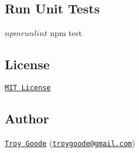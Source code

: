 \subsection*{Run Unit Tests}


\begin{DoxyCode}
$ npm run lint
$ npm test
\end{DoxyCode}


\subsection*{License}

\href{http://www.opensource.org/licenses/mit-license.php}{\tt M\+IT License}

\subsection*{Author}

\href{https://github.com/TroyGoode}{\tt Troy Goode} (\href{mailto:troygoode@gmail.com}{\tt troygoode@gmail.\+com}) 